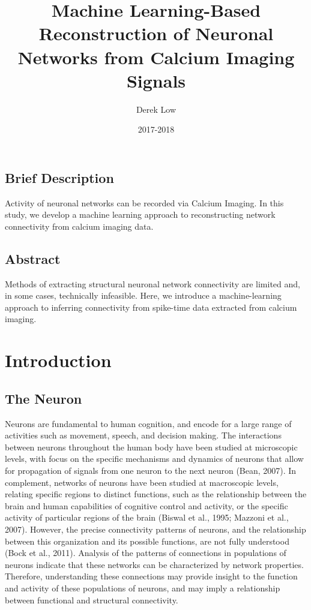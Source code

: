 \documentclass[11pt]{article}
\title{Machine Learning-Based Reconstruction of Neuronal Networks from Calcium Imaging Signals}
\author{Derek Low}
\date{2017-2018}
\begin{document}
\maketitle

\subsection{Brief Description}
Activity of neuronal networks can be recorded via Calcium Imaging. In this study, we develop a machine learning approach to reconstructing network connectivity from calcium imaging data.

\subsection{Abstract}
Methods of extracting structural neuronal network connectivity are limited and, in some cases, technically infeasible. Here, we introduce a machine-learning approach to inferring connectivity from spike-time data extracted from calcium imaging.

\section{Introduction}

\subsection{The Neuron}
Neurons are fundamental to human cognition, and encode for a large range of activities such as movement, speech, and decision making. The interactions between neurons throughout the human body have been studied at microscopic levels, with focus on the specific mechanisms and dynamics of neurons that allow for propagation of signals from one neuron to the next neuron (Bean, 2007). In complement, networks of neurons have been studied at macroscopic levels, relating specific regions to distinct functions, such as the relationship between the brain and human capabilities of cognitive control and activity, or the specific activity of particular regions of the brain (Biswal et al., 1995; Mazzoni et al., 2007). However, the precise connectivity patterns of neurons, and the relationship between this organization and its possible functions, are not fully understood (Bock et al., 2011). Analysis of the patterns of connections in populations of neurons indicate that these networks can be characterized by network properties. Therefore, understanding these connections may provide insight to the function and activity of these populations of neurons, and may imply a relationship between functional and structural connectivity.\par
\end{document}
